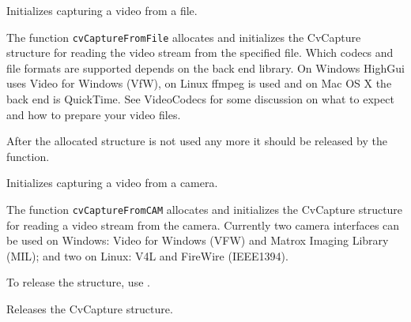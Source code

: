 Initializes capturing a video from a file.


\begin{description}
\end{description}

The function \texttt{cvCaptureFromFile} allocates and initializes the CvCapture structure for reading the video stream from the specified file. Which codecs and file formats are supported depends on the back end library. On Windows HighGui uses Video for Windows (VfW), on Linux ffmpeg is used and on Mac OS X the back end is QuickTime. See VideoCodecs for some discussion on what to expect and how to prepare your video files.

After the allocated structure is not used any more it should be released by the  function.


Initializes capturing a video from a camera.


\begin{description}
\end{description}

The function \texttt{cvCaptureFromCAM} allocates and initializes the CvCapture structure for reading a video stream from the camera. Currently two camera interfaces can be used on Windows: Video for Windows (VFW) and Matrox Imaging Library (MIL); and two on Linux: V4L and FireWire (IEEE1394).

To release the structure, use .

\ifC
{} 

Releases the CvCapture structure.


\begin{description}
\end{description}

